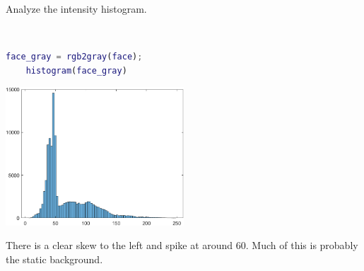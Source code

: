 Analyze the intensity histogram.

\begin{solution}\ 
    \begin{lstlisting}[language=Matlab]
    face_gray = rgb2gray(face);
    histogram(face_gray)
    \end{lstlisting}

    \begin{center}
        \includegraphics[width=0.5\textwidth]{img/e7p8b.png}
    \end{center}
    
    There is a clear skew to the left and spike at around 60. Much of this is probably the static background.
\end{solution}